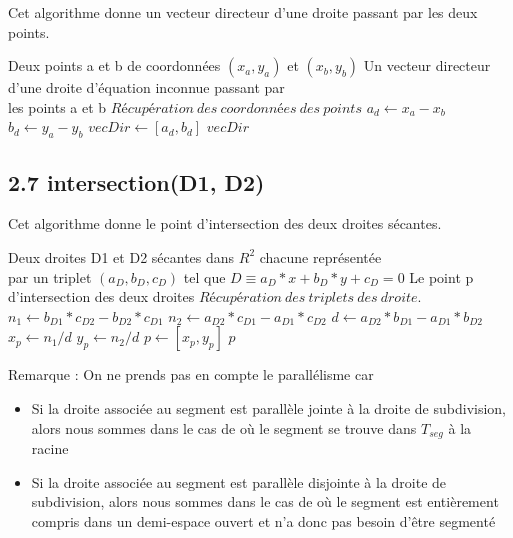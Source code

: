 \documentclass[a4paper,12pt]{report}	%
\begin{document}
	\noindent Cet algorithme donne un vecteur directeur d'une droite passant par les deux points.

	\begin{algorithm}
	\caption{$vecDir(a, b)$}
	\label{Modele pour un algo}
	\begin{algorithmic} [1]
	\REQUIRE Deux points a et b de coordonnées $(x_{a}, y_{a})$ et $(x_{b}, y_{b})$
	\ENSURE Un vecteur directeur d’une droite d'équation inconnue passant par \\les points a et b
	\STATE $Récupération\ des\ coordonnées\ des\ points$
	\STATE $ a_{d} \gets x_{a} - x_{b} $
	\STATE $ b_{d} \gets y_{a} - y_{b} $
	\STATE $ vecDir \gets [a_{d}, b_{d}] $
	\RETURN $ vecDir $
	\end{algorithmic}
	\end{algorithm}
		
	{\subsection*{2.7 intersection(D1, D2)}}
	
	\noindent Cet algorithme donne le point d'intersection des deux droites sécantes.
	
	\begin{algorithm}
	\caption{$intersection(D1, D2)$}
	\label{Modele pour un algo}
	\begin{algorithmic} [1]
	\REQUIRE Deux droites D1 et D2 sécantes dans $R^2$ chacune représentée \\par un triplet $(a_{D}, b_{D}, c_{D})$ tel que $D \equiv a_{D}*x + b_{D}*y + c_{D} = 0$
	\ENSURE Le point p d'intersection des deux droites
	\STATE $Récupération\ des\ triplets\ des\ droite.$
	\STATE $ n_{1} \gets b_{D1}*c_{D2} - b_{D2}*c_{D1}$	
	\STATE $ n_{2} \gets a_{D2}*c_{D1} - a_{D1}*c_{D2}$
	\STATE $ d \gets a_{D2}*b_{D1} - a_{D1}*b_{D2}$
	\STATE $ x_{p} \gets n_{1} / d$
	\STATE $ y_{p} \gets n_{2} / d$
	\STATE $ p \gets [x_{p}, y_{p}]$
	\RETURN $ p $
	\end{algorithmic}
	\end{algorithm}
	
\noindent Remarque : On ne prends pas en compte le parallélisme car 
\begin{itemize}
\item Si la droite associée au segment est parallèle jointe à la droite de subdivision, alors nous sommes dans le cas de où le segment se trouve dans $T_{seg}$ à la racine
\item Si la droite associée au segment est parallèle disjointe à la droite de subdivision, alors nous sommes dans le cas de où le segment est entièrement compris dans un demi-espace ouvert et n'a donc pas besoin d'être segmenté
\end{itemize}
\end{document}
